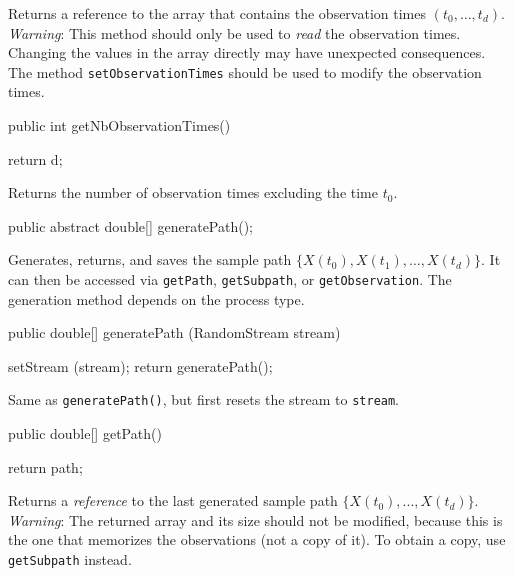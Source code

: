\begin{tabb} Returns a reference to the array that contains the observation times
$(t_0,\dots,t_d)$.
\emph{Warning}: This method should only be used to \emph{read} the observation times.
Changing the values in the array directly may have unexpected consequences.
The method \texttt{setObservationTimes} should be used to modify the observation times.
\end{tabb}
\begin{code}

   public int getNbObservationTimes() \begin{hide} {
        return d;
    }\end{hide}
\end{code}
\begin{tabb} Returns the number of observation times excluding the time $t_{0}$.
\end{tabb}
\begin{code}

   public abstract double[] generatePath();
\end{code}
\begin{tabb} Generates, returns, and saves the sample path
$\{X(t_{0}), X(t_{1}), \ldots, X(t_{d})\}$. It can then be accessed via
\texttt{getPath}, \texttt{getSubpath}, or \texttt{getObservation}.
The generation method depends on the process type.
\end{tabb}
\begin{code}

   public double[] generatePath (RandomStream stream) \begin{hide} {
        setStream (stream);
        return generatePath();
    }\end{hide}
\end{code}
\begin{tabb}
 Same as \texttt{generatePath()}, but first resets the stream to \texttt{stream}.
\end{tabb}
\begin{code}

   public double[] getPath() \begin{hide} {
        return path;
    }\end{hide}
\end{code}
\begin{tabb}
Returns a \emph{reference} to the last generated sample path
$\{X(t_{0}), ... , X(t_{d})\}$.
\emph{Warning}: The returned array and its size should not be modified,
because this is the one that memorizes the observations (not a copy of it).
To obtain a copy, use \texttt{getSubpath} instead.
\end{tabb}
